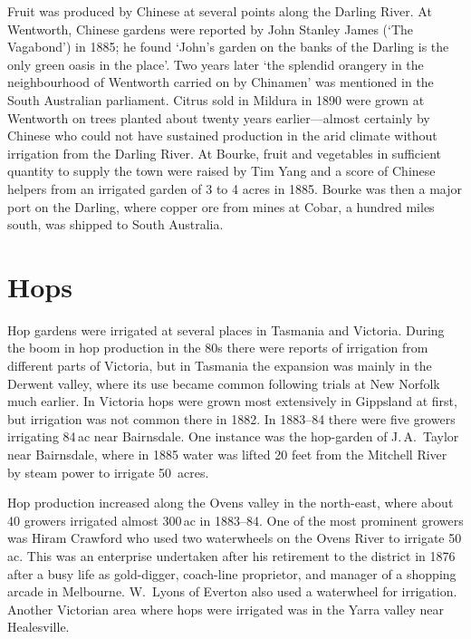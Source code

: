 Fruit was produced by Chinese at several points along the Darling
River.  At Wentworth, Chinese gardens were reported by John Stanley
James (`The Vagabond') in 1885; he found `John's garden on the banks
of the Darling is the only green oasis in the
place'.  Two years later
`the splendid orangery in the neighbourhood of Wentworth carried on by
Chinamen' was mentioned in the South Australian
parliament.  Citrus sold in Mildura in
1890 were grown at Wentworth on trees planted about twenty years
earlier---almost certainly by Chinese who could not have sustained
production in the arid climate without irrigation from the Darling
River.  At Bourke, fruit and
vegetables in sufficient quantity to supply the town were raised by
Tim Yang and a score of Chinese helpers from an irrigated garden of 3
to 4 acres in 1885.  Bourke was then a major port on the Darling,
where copper ore from mines at Cobar, a hundred miles south, was
shipped to South Australia.

\section*{Hops}

Hop gardens were irrigated at several places in Tasmania and Victoria.
During the boom in hop production in the 80s there were reports of
irrigation from different parts of Victoria, but in Tasmania the
expansion was mainly in the Derwent valley, where its use became
common following trials at New Norfolk much earlier.  In Victoria hops
were grown most extensively in Gippsland at first, but irrigation was
not common there in 1882.
In 1883--84 there were five growers irrigating 84\,ac near Bairnsdale.
One instance was the hop-garden of J.\,A.~Taylor near Bairnsdale,
where in 1885 water was lifted 20 feet from the Mitchell River by
steam power to irrigate 50~acres.

Hop production increased along the Ovens valley in the north-east,
where about 40 growers irrigated almost 300\,ac in
1883--84.  One of the most
prominent growers was Hiram Crawford who used two waterwheels on the
Ovens River to irrigate 50\,ac. This was an enterprise
undertaken after his retirement to the district in 1876 after a busy
life as gold-digger, coach-line proprietor, and manager of a shopping
arcade in Melbourne.  W.~Lyons of Everton also used a
waterwheel for irrigation.  Another Victorian area where hops were
irrigated was in the Yarra valley near
Healesville.

